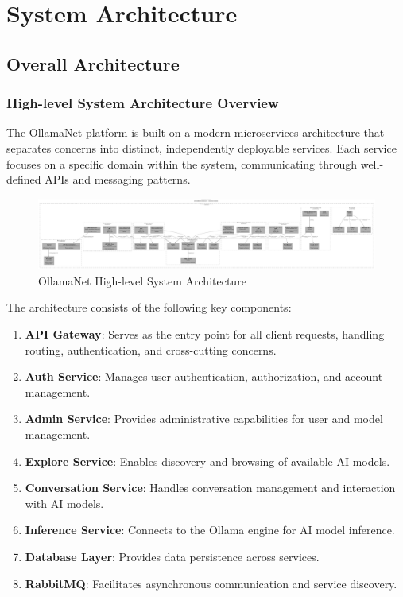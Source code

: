 \def\chapdir{./Chapter04}

\chapter{System Architecture} \label{ch:system-architecture}

\section{Overall Architecture}

\subsection{High-level System Architecture Overview}

The OllamaNet platform is built on a modern microservices architecture that separates concerns into distinct, independently deployable services. Each service focuses on a specific domain within the system, communicating through well-defined APIs and messaging patterns.

\begin{figure}
    \centering
    \includegraphics[width=\textwidth]{./Chapter04/figures/Ollama_architecture_details.pdf}
    \caption{OllamaNet High-level System Architecture}
    \label{fig:system-architecture}
\end{figure}
\clearpage

The architecture consists of the following key components:

\begin{enumerate}
   \item \textbf{API Gateway}: Serves as the entry point for all client requests, handling routing, authentication, and cross-cutting concerns.
   \item \textbf{Auth Service}: Manages user authentication, authorization, and account management.
   \item \textbf{Admin Service}: Provides administrative capabilities for user and model management.
   \item \textbf{Explore Service}: Enables discovery and browsing of available AI models.
   \item \textbf{Conversation Service}: Handles conversation management and interaction with AI models.
   \item \textbf{Inference Service}: Connects to the Ollama engine for AI model inference.
   \item \textbf{Database Layer}: Provides data persistence across services.
   \item \textbf{RabbitMQ}: Facilitates asynchronous communication and service discovery.
\end{enumerate}

